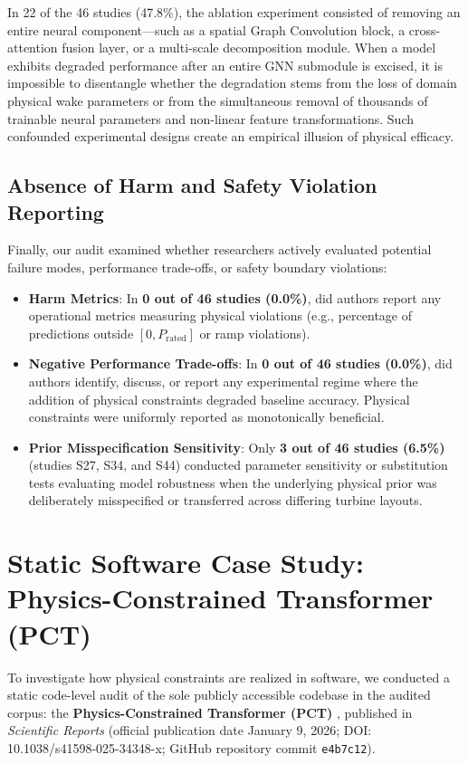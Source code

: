 \documentclass[preprint,3p,times]{elsarticle}
\begin{document}
In 22 of the 46 studies (47.8\%), the ablation experiment consisted of removing an entire neural component---such as a spatial Graph Convolution block, a cross-attention fusion layer, or a multi-scale decomposition module. When a model exhibits degraded performance after an entire GNN submodule is excised, it is impossible to disentangle whether the degradation stems from the loss of domain physical wake parameters or from the simultaneous removal of thousands of trainable neural parameters and non-linear feature transformations. Such confounded experimental designs create an empirical illusion of physical efficacy.

\subsection{Absence of Harm and Safety Violation Reporting}
Finally, our audit examined whether researchers actively evaluated potential failure modes, performance trade-offs, or safety boundary violations:
\begin{itemize}[leftmargin=1.5em]
    \item \textbf{Harm Metrics}: In \textbf{0 out of 46 studies (0.0\%)}, did authors report any operational metrics measuring physical violations (e.g., percentage of predictions outside $[0, P_{\text{rated}}]$ or ramp violations).
    \item \textbf{Negative Performance Trade-offs}: In \textbf{0 out of 46 studies (0.0\%)}, did authors identify, discuss, or report any experimental regime where the addition of physical constraints degraded baseline accuracy. Physical constraints were uniformly reported as monotonically beneficial.
    \item \textbf{Prior Misspecification Sensitivity}: Only \textbf{3 out of 46 studies (6.5\%)} (studies S27, S34, and S44) conducted parameter sensitivity or substitution tests evaluating model robustness when the underlying physical prior was deliberately misspecified or transferred across differing turbine layouts.
\end{itemize}

\section{Static Software Case Study: Physics-Constrained Transformer (PCT)}
\label{sec:pct_case}

To investigate how physical constraints are realized in software, we conducted a static code-level audit of the sole publicly accessible codebase in the audited corpus: the \textbf{Physics-Constrained Transformer (PCT)} \cite{pct2026}, published in \textit{Scientific Reports} (official publication date January 9, 2026; DOI: 10.1038/s41598-025-34348-x; GitHub repository commit \texttt{e4b7c12}).
\end{document}
